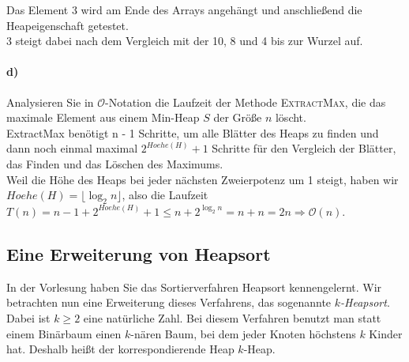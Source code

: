 \documentclass[paper=a4, fontsize=11pt]{scrartcl}
\numberwithin{equation}{section}
\numberwithin{figure}{section}
\numberwithin{table}{section}
\begin{document}
\begin{center}
\end{center}
Das Element 3 wird am Ende des Arrays angehängt und anschließend die Heapeigenschaft getestet.\\
3 steigt dabei nach dem Vergleich mit der 10, 8 und 4 bis zur Wurzel auf.\\

\paragraph{d)}
Analysieren Sie in $\mathcal{O}$-Notation die Laufzeit der Methode \textsc{ExtractMax}, die das maximale Element aus einem Min-Heap $S$ der Größe $n$ löscht. \\

ExtractMax benötigt n - 1 Schritte, um alle Blätter des Heaps zu finden und dann noch einmal maximal $2^{Hoehe(H)}+1$ Schritte für den Vergleich der Blätter, das Finden und das Löschen des Maximums.\\
Weil die Höhe des Heaps bei jeder nächsten Zweierpotenz um 1 steigt, haben wir $Hoehe(H) = \lfloor \log_2 n \rfloor$, also die Laufzeit $T(n) = n-1 + 2^{Hoehe(H)}+1 \leq n+2^{\log_2 n} = n + n = 2n \Rightarrow \mathcal{O}(n)$.

\subsection{Eine Erweiterung von Heapsort}
In der Vorlesung haben Sie das Sortierverfahren Heapsort kennengelernt. Wir betrachten nun eine Erweiterung dieses Verfahrens, das sogenannte \emph{$k$-Heapsort}. Dabei ist $k\ge2$ eine natürliche Zahl. Bei diesem Verfahren benutzt man statt einem Binärbaum einen $k$-nären Baum, bei dem jeder Knoten höchstens $k$ Kinder hat. Deshalb heißt der korrespondierende Heap $k$-Heap. 
\end{document}
